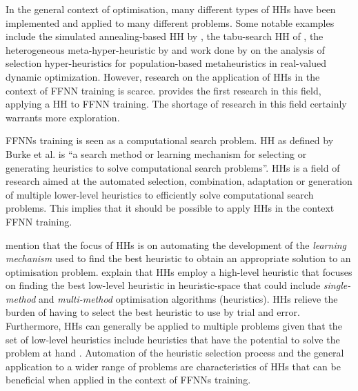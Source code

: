 In the general context of optimisation, many different types of \acp{HH} have been implemented and applied to many different problems. Some notable examples include the simulated annealing-based \ac{HH} by \citeauthor{ref:dowsland:2007} \cite{ref:dowsland:2007}, the tabu-search \ac{HH} of \citeauthor{ref:burke:2010} \cite{ref:burke:2010}, the heterogeneous meta-hyper-heuristic by \citeauthor{ref:grobler:2015} \cite{ref:grobler:2015} and work done by \citeauthor{ref:vanderstockt:2018} \cite{ref:vanderstockt:2018} on the analysis of selection hyper-heuristics for population-based metaheuristics in real-valued dynamic optimization. However, research on the application of \acp{HH} in the context of \acs{FFNN} training is scarce. \citeauthor{ref:nel:2021} \cite{ref:nel:2021} provides the first research in this field, applying a \acs{HH} to \acs{FFNN} training. The shortage of research in this field certainly warrants more exploration.

\acp{FFNN} training is seen as a computational search problem. \Acl{HH} as defined by Burke et al. \cite{ref:burke:2010} is ``a search method or learning mechanism for selecting or generating heuristics to solve computational search problems''. \acp{HH} is a field of research aimed at the automated selection, combination, adaptation or generation of multiple lower-level heuristics to efficiently solve computational search problems. This implies that it should be possible to apply \acp{HH} in the context \acs{FFNN} training.

\citeauthor{ref:grobler:2012} \cite{ref:grobler:2012} mention that the focus of \acp{HH} is on automating the development of the \textit{learning mechanism} used to find the best heuristic to obtain an appropriate solution to an optimisation problem. \citeauthor{ref:grobler:2012} explain that \acp{HH} employ a high-level heuristic that focuses on finding the best low-level heuristic in heuristic-space that could include \textit{single-method} and \textit{multi-method} optimisation algorithms (heuristics). \acp{HH} relieve the burden of having to select the best heuristic to use by trial and error. Furthermore, \acp{HH} can generally be applied to multiple problems given that the set of low-level heuristics include heuristics that have the potential to solve the problem at hand \cite{ref:burke:2010}. Automation of the heuristic selection process and the general application to a wider range of problems are characteristics of \acp{HH} that can be beneficial when applied in the context of \acp{FFNN} training.

